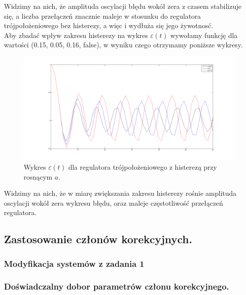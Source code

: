 \documentclass[a4paper,10pt]{article}
\begin{document}
Widzimy na nich, że amplituda oscylacji błędu wokół zera z czasem stabilizuje się, a liczba przełączeń znacznie maleje w stosunku do regulatora trójpołożeniowego bez histerezy, a więc i wydłuża się jego żywotnosć. \\
Aby zbadać wpływ zakresu histerezy na wykres $\varepsilon(t)$ wywołamy funkcję dla wartości (0.15, 0.05, 0.16, false), w wyniku czego otrzymamy poniższe wykresy.

\begin{figure}[!h]
    \centering
	\includegraphics[width=120mm]{CW3-trojpolozeniowy-e-n015.png}
	\caption{Wykres $\varepsilon(t)$ dla regulatora trójpołożeniowego z histerezą przy rosnącym $a$.}
    \label{fig:Rysunek}
\end{figure}

\newpage Widzimy na nich, że w miarę zwiększania zakresu histerezy rośnie amplituda oscylacji wokół zera wykresu błędu, oraz maleje częstotliwość przełączeń regulatora.



\subsection{Zastosowanie członów korekcyjnych.}\label{sec:zad2}
\subsubsection{Modyfikacja systemów z zadania 1}\label{sec:zad2_1}
\subsubsection{Doświadczalny dobor parametrów członu korekcyjnego.}\label{sec:zad2_2}
\end{document}

